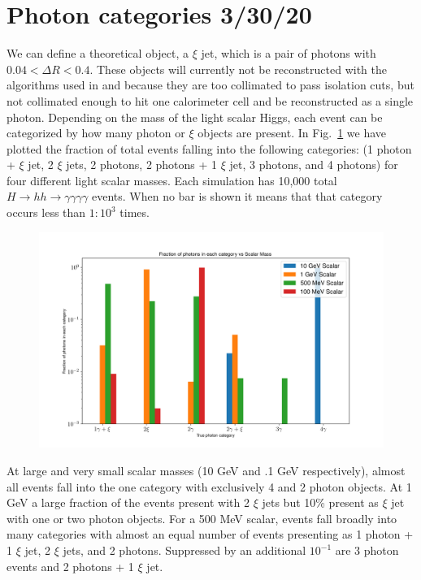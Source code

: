 \documentclass[aps,onecolumn,twoside,secnumarabic,balancelastpage,amsmath,amssymb,nofootinbib,hyperref=pdftex]{revtex4}
\begin{document}
\section{ Photon categories \tiny{3/30/20}}
We can define a theoretical object, a $\xi$ jet, which is a pair of photons with $0.04 < \Delta R < 0.4$. These objects will currently not be reconstructed with the algorithms used in \cite{Chawdhry:2019bji} and \cite{Aaboud:2018djx} because they are too collimated to pass isolation cuts, but not collimated enough to hit one calorimeter cell and be reconstructed as a single photon. Depending on the mass of the light scalar Higgs, each event can be categorized by how many photon or $\xi$ objects are present. In Fig.~\ref{fig:2} we have plotted the fraction of total events falling into the following categories: (1 photon + $\xi$ jet, 2 $\xi$ jets, 2 photons, 2 photons + 1 $\xi$ jet, 3 photons, and 4 photons) for four different light scalar masses. Each simulation has 10,000 total $H\rightarrow hh\rightarrow \gamma\gamma\gamma\gamma$ events. When no bar is shown it means that that category occurs less than $1:10^3$ times. 

\begin{figure}[t]
\begin{center}
\includegraphics[width=12cm]{photon_fraction.png}
\caption{}
\label{fig:2}
\end{center}
\end{figure}

At large and very small scalar masses (10 GeV and .1 GeV respectively), almost all events fall into the one category with exclusively 4 and 2 photon objects. At 1 GeV a large fraction of the events present with 2 $\xi$ jets but 10\% present as $\xi$ jet with one or two photon objects. For a 500 MeV scalar, events fall broadly into many categories with almost an equal number of events presenting as 1 photon + 1 $\xi$ jet, 2 $\xi$ jets, and 2 photons. Suppressed by an additional $10^{-1}$ are 3 photon events and 2 photons + 1 $\xi$ jet. 
\end{document}
